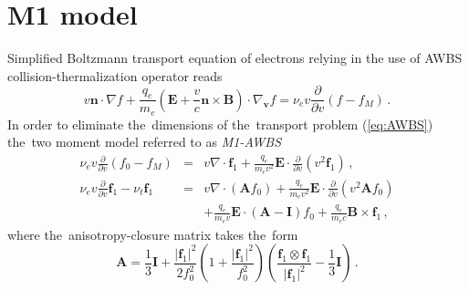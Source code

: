 \documentclass[review]{elsarticle}
\newcommand{\pdv}[2]{\frac{\partial{#1}}{\partial{#2}}}
\newcommand{\vect}[1]{\boldsymbol{#1}}
\newcommand{\matr}[1]{\mathbf{#1}}
\newcommand{\nue}{\nu_{e}}
\newcommand{\nutot}{\nu_{t}}
\newcommand{\vmag}{v}
\newcommand{\vn}{\vect{n}}
\newcommand{\E}{\vect{E}}
\newcommand{\B}{\vect{B}}
\newcommand{\qe}{q_e}
\newcommand{\me}{m_e}
\newcommand{\fM}{f_M}
\newcommand{\fzero}{f_0}
\newcommand{\fone}{\vect{f}_1}
\newcommand{\MI}{\matr{I}}
\newcommand{\MA}{\matr{A}}
\renewcommand{\refeq}[1]{(\ref{#1})}
\begin{document}
\section{M1 model}\label{sec:m1_model}
Simplified Boltzmann transport equation of electrons relying in the use of AWBS
collision-thermalization operator \cite{AWBS_PRL1986} reads
\begin{equation}
  \vmag\vn\cdot\nabla f + \frac{\qe}{\me}\left( \E + 
  \frac{\vmag}{c}\vn\times\B\right)\cdot\nabla_{\vect{v}} f = \nue \vmag 
  \pdv{}{\vmag}\left( f - \fM\right)\, .
  \label{eq:AWBS}
\end{equation}
In order to eliminate the~dimensions of the~transport problem \refeq{eq:AWBS}
the~two moment model referred to as \textit{M1-AWBS} 
\begin{eqnarray}
  \nue\vmag\pdv{}{\vmag}\left(\fzero - \fM \right) &=&
  \vmag\nabla\cdot\fone + \frac{\qe}{\me\vmag^2}\E\cdot\pdv{}{\vmag}
  \left( \vmag^2 \fone\right)\, , 
  \label{eq:M1f0}\\
  \nue\vmag\pdv{}{\vmag}\fone - \nutot\fone &=& 
  \vmag\nabla\cdot\left(\MA\fzero\right) + 
  \frac{\qe}{\me\vmag^2}\E\cdot\pdv{}{\vmag}
  \left( \vmag^2 \MA\fzero\right) \nonumber\\
  && + \frac{\qe}{\me\vmag}\E\cdot\left( \MA - \MI \right)\fzero +
  \frac{\qe}{\me c}\B\times\fone\, ,
  \label{eq:M1f1}
\end{eqnarray}
where the~anisotropy-closure matrix takes the~form
\begin{equation}
  \MA = \frac{1}{3}\MI + \frac{|\fone|^2}{2\fzero^2}
  \left( 1 + \frac{|\fone|^2}{\fzero^2} \right)
  \left( \frac{\fone\otimes\fone}{|\fone|^2} - \frac{1}{3}\MI\right)\, .
\end{equation}
\end{document}
